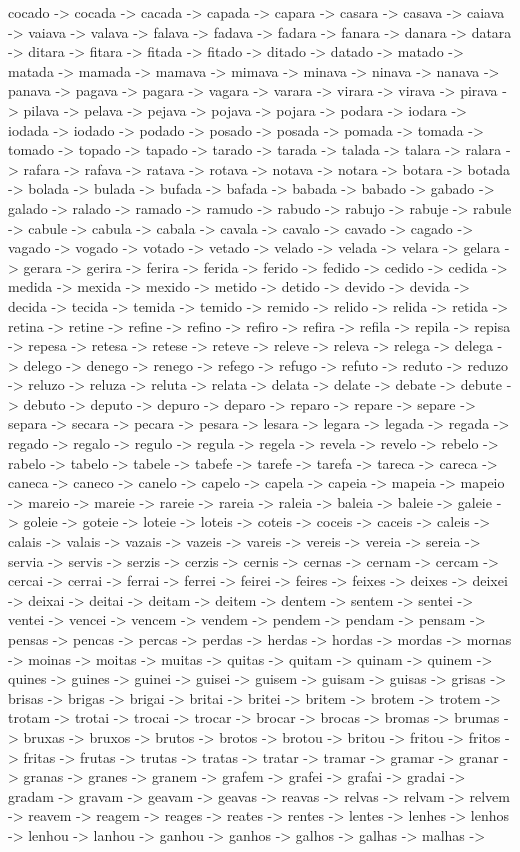\documentclass[a4paper,11pt]{article}
\begin{document}
cocado -> cocada -> cacada -> capada -> capara -> casara -> casava -> caiava -> vaiava -> valava -> falava -> fadava -> fadara -> fanara -> danara -> datara -> ditara -> fitara -> fitada -> fitado -> ditado -> datado -> matado -> matada -> mamada -> mamava -> mimava -> minava -> ninava -> nanava -> panava -> pagava -> pagara -> vagara -> varara -> virara -> virava -> pirava -> pilava -> pelava -> pejava -> pojava -> pojara -> podara -> iodara -> iodada -> iodado -> podado -> posado -> posada -> pomada -> tomada -> tomado -> topado -> tapado -> tarado -> tarada -> talada -> talara -> ralara -> rafara -> rafava -> ratava -> rotava -> notava -> notara -> botara -> botada -> bolada -> bulada -> bufada -> bafada -> babada -> babado -> gabado -> galado -> ralado -> ramado -> ramudo -> rabudo -> rabujo -> rabuje -> rabule -> cabule -> cabula -> cabala -> cavala -> cavalo -> cavado -> cagado -> vagado -> vogado -> votado -> vetado -> velado -> velada -> velara -> gelara -> gerara -> gerira -> ferira -> ferida -> ferido -> fedido -> cedido -> cedida -> medida -> mexida -> mexido -> metido -> detido -> devido -> devida -> decida -> tecida -> temida -> temido -> remido -> relido -> relida -> retida -> retina -> retine -> refine -> refino -> refiro -> refira -> refila -> repila -> repisa -> repesa -> retesa -> retese -> reteve -> releve -> releva -> relega -> delega -> delego -> denego -> renego -> refego -> refugo -> refuto -> reduto -> reduzo -> reluzo -> reluza -> reluta -> relata -> delata -> delate -> debate -> debute -> debuto -> deputo -> depuro -> deparo -> reparo -> repare -> separe -> separa -> secara -> pecara -> pesara -> lesara -> legara -> legada -> regada -> regado -> regalo -> regulo -> regula -> regela -> revela -> revelo -> rebelo -> rabelo -> tabelo -> tabele -> tabefe -> tarefe -> tarefa -> tareca -> careca -> caneca -> caneco -> canelo -> capelo -> capela -> capeia -> mapeia -> mapeio -> mareio -> mareie -> rareie -> rareia -> raleia -> baleia -> baleie -> galeie -> goleie -> goteie -> loteie -> loteis -> coteis -> coceis -> caceis -> caleis -> calais -> valais -> vazais -> vazeis -> vareis -> vereis -> vereia -> sereia -> servia -> servis -> serzis -> cerzis -> cernis -> cernas -> cernam -> cercam -> cercai -> cerrai -> ferrai -> ferrei -> feirei -> feires -> feixes -> deixes -> deixei -> deixai -> deitai -> deitam -> deitem -> dentem -> sentem -> sentei -> ventei -> vencei -> vencem -> vendem -> pendem -> pendam -> pensam -> pensas -> pencas -> percas -> perdas -> herdas -> hordas -> mordas -> mornas -> moinas -> moitas -> muitas -> quitas -> quitam -> quinam -> quinem -> quines -> guines -> guinei -> guisei -> guisem -> guisam -> guisas -> grisas -> brisas -> brigas -> brigai -> britai -> britei -> britem -> brotem -> trotem -> trotam -> trotai -> trocai -> trocar -> brocar -> brocas -> bromas -> brumas -> bruxas -> bruxos -> brutos -> brotos -> brotou -> britou -> fritou -> fritos -> fritas -> frutas -> trutas -> tratas -> tratar -> tramar -> gramar -> granar -> granas -> granes -> granem -> grafem -> grafei -> grafai -> gradai -> gradam -> gravam -> geavam -> geavas -> reavas -> relvas -> relvam -> relvem -> reavem -> reagem -> reages -> reates -> rentes -> lentes -> lenhes -> lenhos -> lenhou -> lanhou -> ganhou -> ganhos -> galhos -> galhas -> malhas -> 
\end{document}
